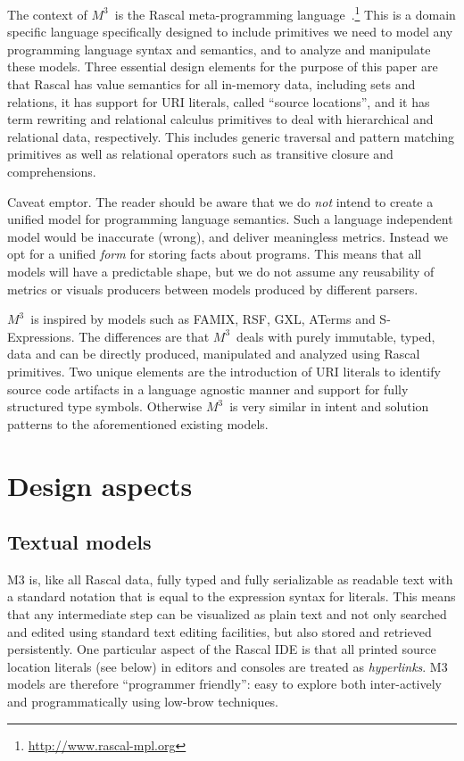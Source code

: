 \documentclass[conference]{IEEEtran}
\newcommand{\mthree}{\ensuremath{M^3}}
\begin{document}
The context of \mthree\ is the Rascal meta-programming 
language~\cite{KvdSV- Rascal11,rascalscam}.\footnote{\url{http://www.rascal-mpl.org}} 
This is a
domain specific language specifically designed to include primitives we need
to model any programming language syntax and semantics, and to analyze and
manipulate these models. Three essential design elements for the purpose of
this paper are that Rascal has value semantics for all in-memory data,
including sets and relations, it has support for URI literals, called ``source
locations'', and it has term rewriting and relational calculus primitives to
deal with hierarchical and relational data, respectively. This includes
generic traversal and pattern matching primitives as well as relational
operators such as transitive closure and comprehensions.

Caveat emptor. The reader should be aware that we do \emph{not} intend to
create a unified model for programming language semantics. Such a language
independent model would be inaccurate (wrong), and deliver meaningless
metrics. Instead we opt for a unified \emph{form} for storing facts about
programs. This means that all models will have a predictable shape, but we do
not assume any reusability of metrics or visuals producers between models
produced by different parsers.

\mthree\ is inspired by models such as FAMIX, RSF, GXL, ATerms and
S-Expressions. The differences are that \mthree\ deals with purely immutable,
typed, data and can be directly produced, manipulated and analyzed using
Rascal primitives. Two unique elements are the introduction of URI literals to
identify source code artifacts in a language agnostic manner and support for
fully structured type symbols. Otherwise \mthree\  is very similar in intent
and solution patterns to the aforementioned existing models.

\section{Design aspects}

\subsection{Textual models}

M3 is, like all Rascal data, fully typed and fully serializable as readable
text with a standard notation that is equal to the expression syntax for
literals. This means that any intermediate step can be visualized as plain
text and not only searched and edited using standard text editing facilities,
but also stored and retrieved persistently. One particular aspect of the
Rascal IDE is that all printed source location literals (see below) in editors
and consoles are treated as \emph{hyperlinks}. M3 models are therefore
``programmer friendly'': easy to explore both inter-actively and
programmatically using low-brow techniques.
\end{document}
